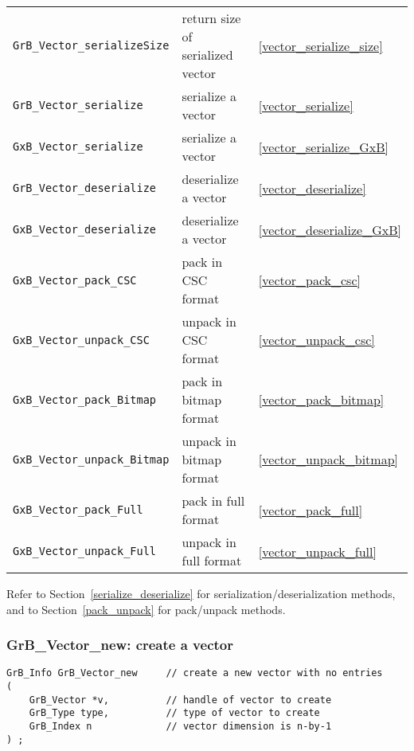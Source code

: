 \documentclass[12pt]{article}
\begin{document}
{\begin{tabular}{lll}
\hline
\hline
\verb'GrB_Vector_serializeSize'  & return size of serialized vector & \ref{vector_serialize_size} \\
\verb'GrB_Vector_serialize'      & serialize a vector               & \ref{vector_serialize} \\
\verb'GxB_Vector_serialize'      & serialize a vector               & \ref{vector_serialize_GxB} \\
\verb'GrB_Vector_deserialize'    & deserialize a vector             & \ref{vector_deserialize} \\
\verb'GxB_Vector_deserialize'    & deserialize a vector             & \ref{vector_deserialize_GxB} \\
\hline
\hline
\verb'GxB_Vector_pack_CSC'         & pack in CSC format      & \ref{vector_pack_csc} \\
\verb'GxB_Vector_unpack_CSC'       & unpack in CSC format    & \ref{vector_unpack_csc} \\
\hline
\verb'GxB_Vector_pack_Bitmap'      & pack in bitmap format   & \ref{vector_pack_bitmap} \\
\verb'GxB_Vector_unpack_Bitmap'    & unpack in bitmap format & \ref{vector_unpack_bitmap} \\
\hline
\verb'GxB_Vector_pack_Full'        & pack in full format     & \ref{vector_pack_full} \\
\verb'GxB_Vector_unpack_Full'      & unpack in full format   & \ref{vector_unpack_full} \\
\hline
\end{tabular}
}

\vspace{0.2in}
Refer to
Section~\ref{serialize_deserialize} for serialization/deserialization methods, and to
Section~\ref{pack_unpack} for pack/unpack methods.

\newpage
\subsubsection{{\sf GrB\_Vector\_new:}           create a vector}
\label{vector_new}

\begin{mdframed}[userdefinedwidth=6in]
{\footnotesize
\begin{verbatim}
GrB_Info GrB_Vector_new     // create a new vector with no entries
(
    GrB_Vector *v,          // handle of vector to create
    GrB_Type type,          // type of vector to create
    GrB_Index n             // vector dimension is n-by-1
) ;
\end{verbatim}
} \end{mdframed}
\end{document}
